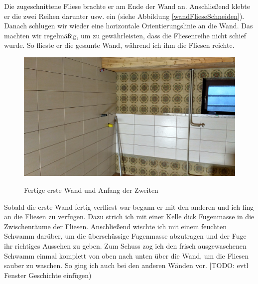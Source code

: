 Die zugeschnittene Fliese brachte er am Ende der Wand an. Anschließend klebte er die zwei Reihen darunter usw. ein (siehe Abbildung \ref{wandFlieseSchneiden}). Danach schlugen wir wieder eine horizontale Orientierungslinie an die Wand. Das machten wir regelmäßig, um zu gewährleisten, dass die Fliesenreihe nicht schief wurde. So flieste er die gesamte Wand, während ich ihm die Fliesen reichte.

\begin{figure}[h]
	\begin{center}
		\noindent\includegraphics[scale=0.1]{Resources/Praktikum/IMG_20180806_081011_HDR.jpg}
		\label{ersteWand}
		\caption{Fertige erste Wand und Anfang der Zweiten}	
	\end{center}
\end{figure}

Sobald die erste Wand fertig verfliest war begann er mit den anderen und ich fing an die Fliesen zu verfugen. Dazu strich ich mit einer Kelle dick Fugenmasse in die Zwischenräume der Fliesen. Anschließend wischte ich mit einem feuchten Schwamm darüber, um die überschüssige Fugenmasse abzutragen und der Fuge ihr richtiges Aussehen zu geben. Zum Schuss zog ich den frisch ausgewaschenen Schwamm einmal komplett von oben nach unten über die Wand, um die Fliesen sauber zu waschen. So ging ich auch bei den anderen Wänden vor. [TODO: evtl Fenster Geschichte einfügen)

